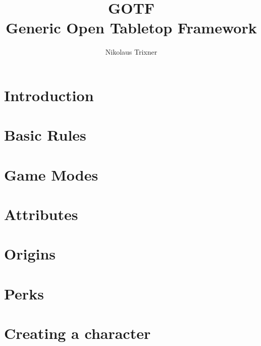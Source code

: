 \documentclass[a4paper]{book}
\begin{document}
    \title{GOTF \\ Generic Open Tabletop Framework}
    \author{Nikolaus Trixner}

    \maketitle

    \tableofcontents


    \part{Introduction}\label{part:intrudction}
    


    \part{Basic Rules}\label{part:basicRules}
    


    \part{Game Modes}\label{part:gameModes}
    


    \part{Attributes}\label{part:attributes}
    
    
    


    \part{Origins}\label{part:origins}
    
    
    


    \part{Perks}\label{part:perks}
    
    
    
    
    
    


    \part{Creating a character}\label{part:characterCreation}
    
\end{document}
